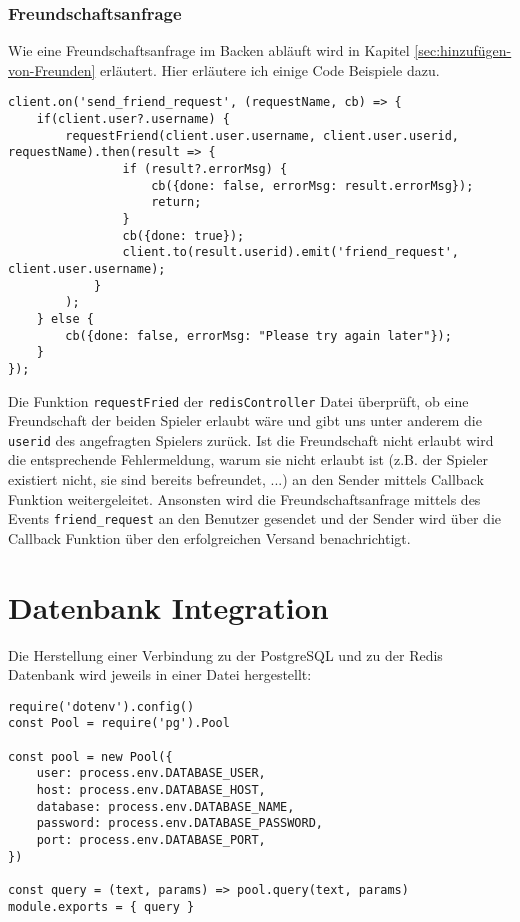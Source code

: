 \subsubsection{Freundschaftsanfrage}
Wie eine Freundschaftsanfrage im Backen abläuft wird in Kapitel \ref{sec:hinzufügen-von-Freunden} erläutert. Hier erläutere ich einige Code Beispiele dazu.
\begin{lstlisting}[style=codeStyle, caption={Der Listener des send\_friend\_request Events}, label={lst:sendFriendRequest}]
client.on('send_friend_request', (requestName, cb) => {
    if(client.user?.username) {
        requestFriend(client.user.username, client.user.userid, requestName).then(result => {
                if (result?.errorMsg) {
                    cb({done: false, errorMsg: result.errorMsg});
                    return;
                }
                cb({done: true});
                client.to(result.userid).emit('friend_request', client.user.username);
            }
        );
    } else {
        cb({done: false, errorMsg: "Please try again later"});
    }
});
\end{lstlisting}

Die Funktion \verb|requestFried| der \verb|redisController| Datei überprüft, ob eine Freundschaft der beiden Spieler erlaubt wäre und gibt uns unter anderem die \verb|userid| des angefragten Spielers zurück. Ist die Freundschaft nicht erlaubt wird die entsprechende Fehlermeldung, warum sie nicht erlaubt ist (z.B. der Spieler existiert nicht, sie sind bereits befreundet, ...) an den Sender mittels Callback Funktion weitergeleitet. Ansonsten wird die Freundschaftsanfrage mittels des Events \verb|friend_request| an den Benutzer gesendet und der Sender wird über die Callback Funktion über den erfolgreichen Versand benachrichtigt.


\section{Datenbank Integration}
Die Herstellung einer Verbindung zu der PostgreSQL und zu der Redis Datenbank wird jeweils in einer Datei hergestellt:

\begin{lstlisting}[style=codeStyle, caption={Initialisierung der PostgreSQL Datenbank und einer Methode für die Anfragen}, label={lst:pg-pool}]
require('dotenv').config()
const Pool = require('pg').Pool

const pool = new Pool({
    user: process.env.DATABASE_USER,
    host: process.env.DATABASE_HOST,
    database: process.env.DATABASE_NAME,
    password: process.env.DATABASE_PASSWORD,
    port: process.env.DATABASE_PORT,
})

const query = (text, params) => pool.query(text, params)
module.exports = { query }  
\end{lstlisting}

